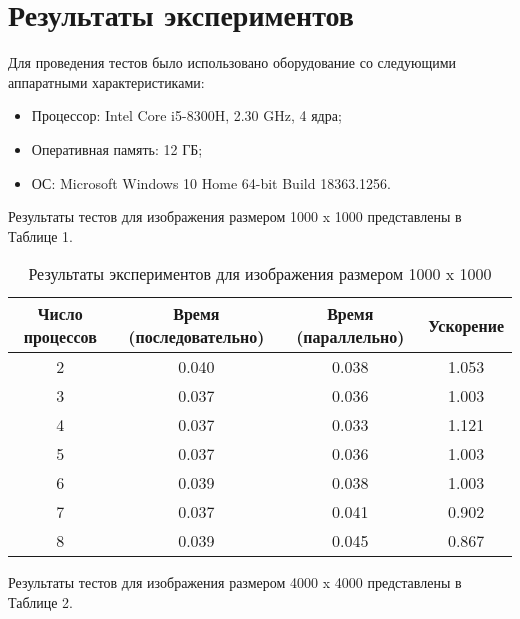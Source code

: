 \documentclass{report}
\begin{document}
	\section*{Результаты экспериментов}
	\par Для проведения тестов было использовано оборудование со следующими аппаратными характеристиками:
	\begin{itemize}
		\item Процессор: Intel Core i5-8300H, 2.30 GHz, 4 ядра;
		\item Оперативная память: 12 ГБ;
		\item ОС: Microsoft Windows 10 Home 64-bit Build 18363.1256.
	\end{itemize}
	\par Результаты тестов для изображения размером 1000 x 1000 представлены в Таблице 1.
	\begin{table}[!h]
		\caption{Результаты экспериментов для изображения размером 1000 x 1000}
		\centering
		\begin{tabular}{|c|c|c|c|}
            \hline
			Число процессов & Время (последовательно) & Время (параллельно) & Ускорение  \\
            \hline
			2        & 0.040           & 0.038       & 1.053      \\
			3        & 0.037           & 0.036       & 1.003      \\
			4        & 0.037           & 0.033       & 1.121      \\
			5        & 0.037           & 0.036       & 1.003      \\
			6        & 0.039           & 0.038       & 1.003      \\
			7        & 0.037           & 0.041       & 0.902      \\
			8        & 0.039           & 0.045       & 0.867      \\
            \hline
		\end{tabular}
	\end{table}
	\par Результаты тестов для изображения размером 4000 x 4000 представлены в Таблице 2.
\end{document}
